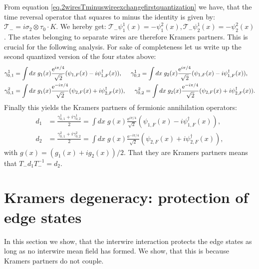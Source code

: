 From equation \eqref{eq.2wiresTminuswireexchangefirstquantization} we have, that the time reversal operator that squares to minus the identity is given by: $\mathcal{T}_- = i\sigma_2\otimes\tau_0 \cdot K$. We hereby get: $\mathcal{T}_-\psi^1_1(x) = -\psi^2_1(x), \mathcal{T}_-\psi^1_2(x) = -\psi^2_2(x)$. The states belonging to separate wires are therefore Kramers partners. This is crucial for the following analysis. For sake of completeness let us write up the second quantized version of the four states above: 
\begin{align}
\gamma^1_{0,1} &= \int dx \; g_1(x)\frac{\text{e}^{i\pi/4}}{\sqrt{2}}(\psi_{1,F}(x)-i\psi^\dagger_{1,F}(x)), \hspace{0.5cm} \gamma^1_{0,2} = \int dx \; g_2(x)\frac{\text{e}^{i\pi/4}}{\sqrt{2}}(\psi_{1,F}(x)-i\psi^\dagger_{1,F}(x)), \nonumber \\
\gamma^2_{0,1} &= \int dx \; g_1(x)\frac{\text{e}^{-i\pi/4}}{\sqrt{2}}(\psi_{2,F}(x)+i\psi^\dagger_{2,F}(x)), \hspace{0.5cm} \gamma^2_{0,2} = \int dx \; g_2(x)\frac{\text{e}^{-i\pi/4}}{\sqrt{2}}(\psi_{2,F}(x) + i \psi^\dagger_{2,F}(x)). \nonumber 
\end{align}
Finally this yields the Kramers partners of fermionic annihilation operators:
\begin{align}
d_1 &= \frac{\gamma^1_{0,1} + i \gamma^1_{0,2}}{2} = \int dx\; g(x)\frac{\text{e}^{i\pi/4}}{\sqrt{2}}(\psi_{1,F}(x)-i\psi^\dagger_{1,F}(x)), \nonumber \\
d_2 &= \frac{\gamma^2_{0,1} + i \gamma^2_{0,2}}{2} = \int dx\; g(x)\frac{\text{e}^{-i\pi/4}}{\sqrt{2}}(\psi_{2,F}(x)+i\psi^\dagger_{2,F}(x)),
\label{eq.2wiresedgestatesannihilationoperators}
\end{align}
with $g(x) = (g_1(x) + ig_2(x))/2$. That they are Kramers partners means that $T_-d_1T_-^{-1} = d_2$. 

\section{Kramers degeneracy: protection of edge states}
\label{sec.2wireskramersdegeneracy}
In this section we show, that the interwire interaction protects the edge states as long as no interwire mean field has formed. We show, that this is because Kramers partners do not couple.

